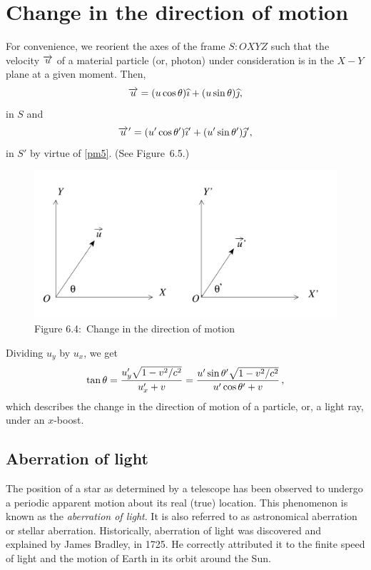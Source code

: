 \vspace{-.2cm}

\section{Change in the direction of 
motion}
For convenience, we reorient the axes of the frame 
$S:OXYZ$ 
such that the velocity $\overrightarrow{u}$ of a material 
particle 
(or, 
photon) under consideration is in the $X-Y$ plane at a 
given moment. Then,
\begin{align*}
\overrightarrow{u}=(u\cos{\theta}){\widehat{\imath}}+ (u\sin{\theta}){\widehat{\jmath}},
\end{align*}
in  $S$ and
\begin{align*}
{\ensuremath{\overrightarrow{u}\hspace*{.3pt}'}}=(u'\cos{\theta}'){\widehat{\imath}}'+ (u'\sin{\theta}'){\widehat{\jmath}}',
\end{align*}
in $S'$ by virtue of \eqref{pm5}. (See Figure~6.5.)

\begin{figure}[H]
\centering
\includegraphics[scale=.4]{src/images/lbk-graphics/aberration}
\caption*{Figure 6.4:~Change in the 
direction of motion}
\end{figure}


Dividing $u_y$ by  $u_x$, we get
\begin{align}\label{pm-add-1}
\tan{\theta}= \frac{u'_y\sqrt{1-v^2/c^2}}{u'_x+v}=
\frac{u'\sin{\theta}'\sqrt{1-v^2/c^2}}{u'\cos{\theta}'+v}\,,
\end{align}
which describes the change in the direction of motion of a 
particle, or, a light ray, under an $x$-boost.

\subsection{Aberration of light}
The position of a star as determined by a telescope has been 
observed to undergo a periodic apparent motion  about its 
real (true) location. This phenomenon is known as the 
\textsl{aberration of light}. It is also referred to as 
astronomical aberration or stellar aberration. Historically, 
aberration of light was discovered and explained  by  James 
Bradley, in 1725. He correctly attributed it to the finite 
speed of light and the motion of Earth in its orbit around 
the Sun.

